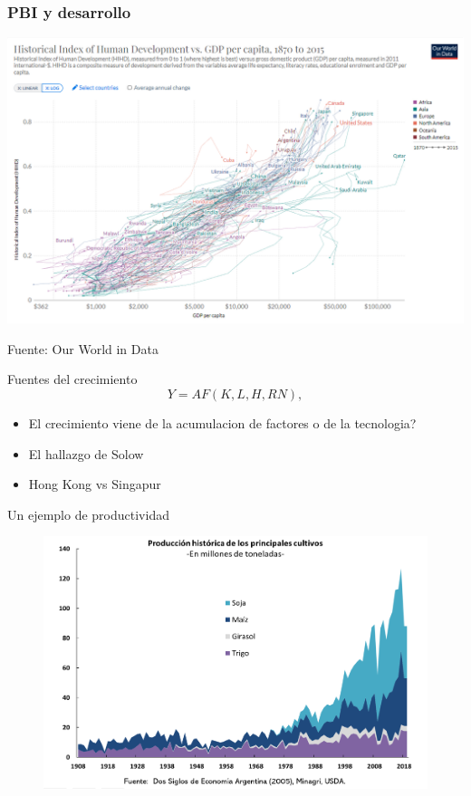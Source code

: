 \documentclass{beamer}
\begin{document}
\begin{frame}
\frametitle{PBI y desarrollo}
\begin{center}
    \href{https://ourworldindata.org/grapher/hdi-vs-gdp-per-capita} {\includegraphics[scale=0.35]{../Tema_11.27_hdi_2.png}}
\end{center}
Fuente: Our World in Data
\end{frame}

\begin{frame}{Fuentes del crecimiento}
   \begin{equation}
    Y = AF(K,L,H,RN),
\end{equation} 
\begin{itemize}
    \item El crecimiento viene de la acumulacion de factores o de la tecnologia?
    \item El hallazgo de Solow
    \item Hong Kong vs Singapur
\end{itemize}
\end{frame}

\begin{frame}{Un ejemplo de productividad}
    \begin{figure} [H]   \includegraphics[scale=0.55]{../Figures/C17.3.png}
\label{fig:17.3}
\end{figure}
\end{frame}
\end{document}
